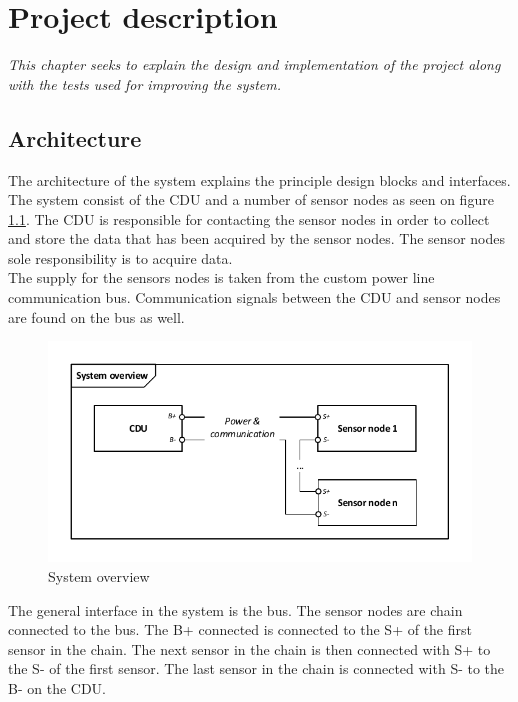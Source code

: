 \chapter{Project description}
\textit{This chapter seeks to explain the design and implementation of the project along with the tests used for improving the system.}
\section{Architecture}
The architecture of the system explains the principle design blocks and interfaces. The system consist of the CDU and a number of sensor nodes as seen on figure \ref{fig:systembdd}. The CDU is responsible for contacting the sensor nodes in order to collect and store the data that has been acquired by the sensor nodes. The sensor nodes sole responsibility is to acquire data.\\
The supply for the sensors nodes is taken from the custom power line communication bus. Communication signals between the CDU and sensor nodes are found on the bus as well.\\ 
\begin{figure}[H]
	\centering
	\includegraphics[width=.9\textwidth]{billeder/11ProjectDescription/systembdd}
	\caption{System overview}
	\label{fig:systembdd}
\end{figure}
The general interface in the system is the bus. The sensor nodes are chain connected to the bus. The B+ connected is connected to the S+ of the first sensor in the chain. The next sensor in the chain is then connected with S+ to the S- of the first sensor. The last sensor in the chain is connected with S- to the B- on the CDU.\\


